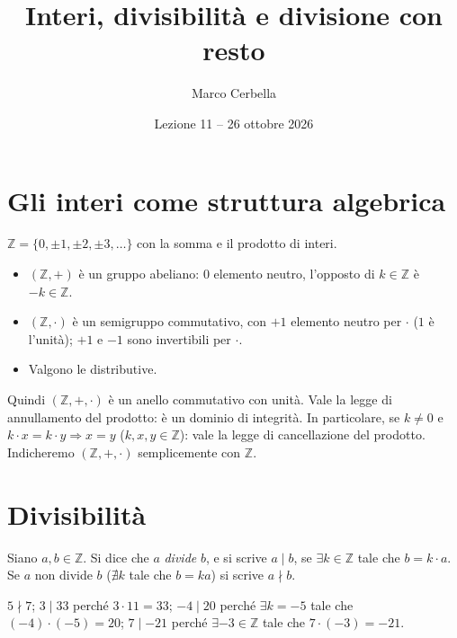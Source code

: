 \documentclass[11pt,a4paper]{article}
\title{Interi, divisibilità e divisione con resto}
\author{Marco Cerbella}
\date{Lezione 11 -- 26 ottobre 2026}
\begin{document}
\maketitle

\section{Gli interi come struttura algebrica}

$\mathbb{Z} = \{0, \pm 1, \pm 2, \pm 3, \dots\}$ con la somma e il prodotto di interi.
\begin{itemize}
  \item $(\mathbb{Z}, +)$ è un gruppo abeliano: $0$ elemento neutro, l'opposto di $k \in \mathbb{Z}$ è $-k \in \mathbb{Z}$.
  \item $(\mathbb{Z}, \cdot)$ è un semigruppo commutativo, con $+1$ elemento neutro per $\cdot$ ($1$ è l'unità); $+1$ e $-1$ sono invertibili per $\cdot$.
  \item Valgono le distributive.
\end{itemize}
Quindi $(\mathbb{Z}, +, \cdot)$ è un anello commutativo con unità. Vale la legge di annullamento del prodotto: è un dominio di integrità. In particolare, se $k \neq 0$ e $k\cdot x = k\cdot y \Rightarrow x = y$ ($k, x, y \in \mathbb{Z}$): vale la legge di cancellazione del prodotto. Indicheremo $(\mathbb{Z}, +, \cdot)$ semplicemente con $\mathbb{Z}$.

\section{Divisibilità}

\begin{definizione}
Siano $a, b \in \mathbb{Z}$. Si dice che $a$ \emph{divide} $b$, e si scrive $a \mid b$, se $\exists k \in \mathbb{Z}$ tale che $b = k\cdot a$. Se $a$ non divide $b$ ($\nexists k$ tale che $b = ka$) si scrive $a \nmid b$.
\end{definizione}

\begin{esempio}
$5 \nmid 7$; \quad $3 \mid 33$ perché $3\cdot 11 = 33$; \quad $-4 \mid 20$ perché $\exists k = -5$ tale che $(-4)\cdot(-5) = 20$; \quad $7 \mid -21$ perché $\exists -3 \in \mathbb{Z}$ tale che $7\cdot(-3) = -21$.
\end{esempio}
\end{document}
